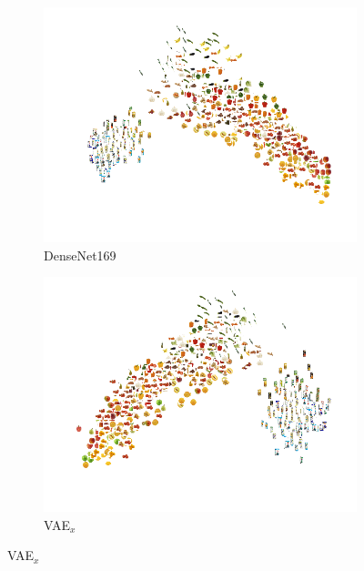 

\begin{figure}[t]
     \centering
     \begin{subfigure}[b]{0.3\textwidth}
         \centering
         \includegraphics[width=\textwidth]{PaperB/figures_and_tables/latent_space_visualizations/pca_densenet.png}
         \caption{DenseNet169}
         \label{fig:pca_densenet}
     \end{subfigure}
     \begin{subfigure}[b]{0.3\textwidth}
         \centering
         \includegraphics[width=\textwidth]{PaperB/figures_and_tables/latent_space_visualizations/pca_latents_vae_seed2.png}
         \caption{VAE$_{x}$}
         \label{fig:pca_vae_x}

\end{subfigure}
\end{figure}
